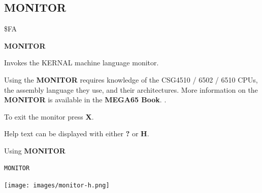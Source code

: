 \subsection{MONITOR}
\begin{description}[leftmargin=2cm,style=nextline]
\item [Token:]    \$FA

\item [Format:]   {\bf MONITOR}

\item [Usage:]    Invokes the KERNAL machine language monitor.

\item [Remarks:]  Using the {\bf MONITOR} requires knowledge of the CSG4510 / 6502 / 6510 CPUs, the assembly language they use, and their architectures. More information on the {\bf MONITOR} is available in \ifdefined\printmanual
                     the {\bf MEGA65 Book}.
                  \else
                     .
                  \fi

                  To exit the monitor press {\bf X}.

                  Help text can be displayed with either {\bf ?} or {\bf H}.

\item [Example:]  Using {\bf MONITOR}

\begin{tcolorbox}[colback=black,coltext=white]
\verbatimfont{\codefont}
\begin{verbatim}
MONITOR
\end{verbatim}
\end{tcolorbox}

\item \begin{center}\texttt{[image: images/monitor-h.png]}\end{center}
\end{description}


\newpage
